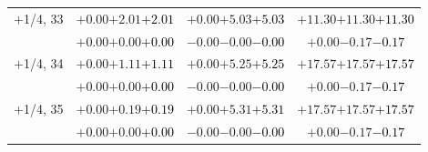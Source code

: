 \documentclass[compress]{beamer}
\begin{document}
\begin{frame}
\begin{tabular}{r | c | c | c}
$+$1/4, 33 & $+0.00$\hspace{0.1 cm}$+2.01$\hspace{0.1 cm}\textcolor{black}{$+2.01$} & $+0.00$\hspace{0.1 cm}$+5.03$\hspace{0.1 cm}\textcolor{black}{$+5.03$} & $+11.30$\hspace{0.1 cm}$+11.30$\hspace{0.1 cm}\textcolor{black}{$+11.30$} \\
           & $+0.00$\hspace{0.1 cm}$+0.00$\hspace{0.1 cm}\textcolor{black}{$+0.00$} & $-0.00$\hspace{0.1 cm}$-0.00$\hspace{0.1 cm}\textcolor{black}{$-0.00$} & $+0.00$\hspace{0.1 cm}$-0.17$\hspace{0.1 cm}\textcolor{black}{$-0.17$} \\
$+$1/4, 34 & $+0.00$\hspace{0.1 cm}$+1.11$\hspace{0.1 cm}\textcolor{black}{$+1.11$} & $+0.00$\hspace{0.1 cm}$+5.25$\hspace{0.1 cm}\textcolor{black}{$+5.25$} & $+17.57$\hspace{0.1 cm}$+17.57$\hspace{0.1 cm}\textcolor{black}{$+17.57$} \\
           & $+0.00$\hspace{0.1 cm}$+0.00$\hspace{0.1 cm}\textcolor{black}{$+0.00$} & $-0.00$\hspace{0.1 cm}$-0.00$\hspace{0.1 cm}\textcolor{black}{$-0.00$} & $+0.00$\hspace{0.1 cm}$-0.17$\hspace{0.1 cm}\textcolor{black}{$-0.17$} \\
$+$1/4, 35 & $+0.00$\hspace{0.1 cm}$+0.19$\hspace{0.1 cm}\textcolor{black}{$+0.19$} & $+0.00$\hspace{0.1 cm}$+5.31$\hspace{0.1 cm}\textcolor{black}{$+5.31$} & $+17.57$\hspace{0.1 cm}$+17.57$\hspace{0.1 cm}\textcolor{black}{$+17.57$} \\
           & $+0.00$\hspace{0.1 cm}$+0.00$\hspace{0.1 cm}\textcolor{black}{$+0.00$} & $-0.00$\hspace{0.1 cm}$-0.00$\hspace{0.1 cm}\textcolor{black}{$-0.00$} & $+0.00$\hspace{0.1 cm}$-0.17$\hspace{0.1 cm}\textcolor{black}{$-0.17$} \\

\end{tabular}
\end{frame}
\end{document}
